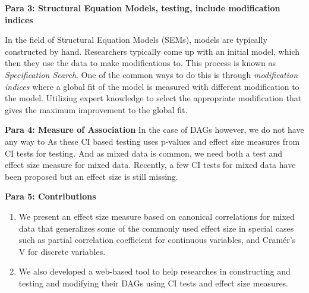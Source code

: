 \documentclass{article}
\begin{document}
\textbf{Para 3: Structural Equation Models, testing, include modification indices}

In the field of Structural Equation Models (SEMs), models are typically
constructed by hand. Researchers typically come up with an initial model, which
then they use the data to make modifications to. This process is known as
\emph{Specification Search}. One of the common ways to do this is through
\emph{modification indices} where a global fit of the model is measured with
different modification to the model. Utilizing expert knowledge to select the
appropriate modification that gives the maximum improvement to the global fit.


\textbf{Para 4: Measure of Association}
In the case of DAGs however, we do not have any way to 
As these CI based testing uses p-values and effect size measures from CI tests
for testing. And as mixed data is common, we need both a test and effect size
measure for mixed data. Recently, a few CI tests for mixed data have been
proposed but an effect size is still missing.


\textbf{Para 5: Contributions}
\begin{enumerate}
	\item We present an effect size measure based on canonical correlations
		for mixed data that generalizes some of the commonly used
		effect size in special cases such as partial correlation
		coefficient for continuous variables, and Cram\'er's V for
		discrete variables.
	\item We also developed a web-based tool to help researches in
		constructing and testing and modifying their DAGs using CI tests and
		effect size measures.
\end{enumerate}
\end{document}
